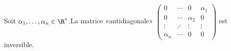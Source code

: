 Soit $\alpha_1, \ldots, \alpha_n \in \R^*$.\newline La matrice «antidiagonale» $\begin{pmatrix} 0 & \cdots & 0 & \alpha_1 \\ 0 & \cdots & \alpha_2 & 0 \\ \vdots & \iddots & \vdots & \vdots \\ \alpha_n & \cdots & 0 & 0 \end{pmatrix}$ est inversible.

\begin{reponses}
\end{reponses}

